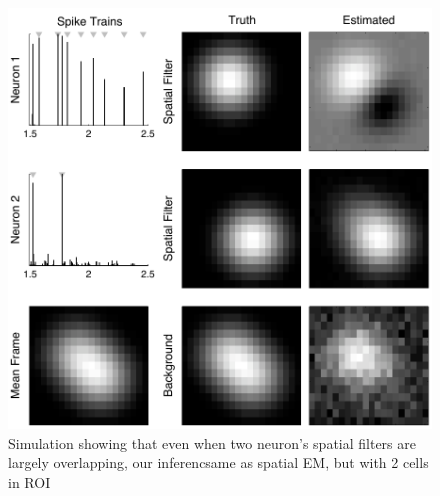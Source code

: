\begin{figure}[H]
\centering \includegraphics[width=.9\linewidth]{../graphics/spatial_multi2}
\caption{Simulation showing that even when two neuron's spatial filters are largely overlapping, our inferencsame as spatial EM, but with 2 cells in ROI} \label{fig:spatial_multi}
\end{figure}



